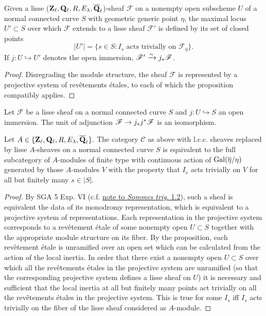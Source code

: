\documentclass[deligne.tex]{subfiles}
\begin{document}
\begin{corollary*}
	Given a lisse ($\mathbf{Z}_\ell,\mathbf{Q}_\ell,R,E_\lambda,\overline{\mathbf{Q}}_{\ell}$)-sheaf
	$\mathscr F$ on a nonempty open subscheme $U$ of a normal connected curve 
	$S$ with geometric generic point $\eta$, the maximal locus $U'\subset S$ 
	over which $\mathscr F$ extends to a lisse sheaf $\mathscr F'$ is defined
	by its set of closed points
	\begin{equation*}
		|U'|=\{s\in S:I_s\text{ acts trivially on }\mathscr F_{\overline\eta}\}.
	\end{equation*}
	If $j:U\hookrightarrow U'$ denotes the open immersion,
	$\mathscr F'\xrightarrow\sim j_*\mathscr F$.
\end{corollary*}
\begin{proof}
	Disregrading the module structure, the sheaf $\mathscr F$ is represented
	by a projective system of revêtements étales, to each of which the
	proposition compatibly applies.
\end{proof}
\begin{corollary*}
	Let $\mathscr F$ be a lisse sheaf on a normal connected curve $S$ and
	$j:U\hookrightarrow S$ an open immersion.
	The unit of adjunction $\mathscr F\rightarrow j_*j^*\mathscr F$ is an 
	isomorphism.
\end{corollary*}
\begin{corollary*}
	Let $A\in\{\mathbf{Z}_\ell,\mathbf{Q}_\ell,R,E_\lambda,\overline{\mathbf{Q}}_{\ell}\}$.
	The category $\mathscr C$ as above with l.c.c. sheaves replaced by lisse
	$A$-sheaves on a normal connected curve $S$ is equivalent to the full 
	subcategory of $A$-modules of finite type with continuous action of
	$\operatorname{Gal}(\overline\eta/\eta)$ generated by those $A$-modules $V$ with
	the property that $I_s$ acts trivially on $V$ for all but finitely many
	$s\in|S|$.
\end{corollary*}
\begin{proof}
	By SGA 5 Exp. VI
	(c.f. \hyperref[sec:st1.2]{note to \emph{Sommes trig.} 1.2}),
	such a sheaf is equivalent the data of its monodromy
	representation, which is equivalent to a projective system of 
	representations. Each representation in the projective system corresponds
	to a revêtement étale of some nonempty open $U\subset S$ together with
	the appropriate module structure on its fiber. By the proposition, each
	revêtement étale is unramified over an open set which can be calculated
	from the action of the local inertia. In order that there exist a
	nonempty open $U\subset S$ over which all the revêtements étales in the
	projective system are unramified (so that the corresponding projective
	system defines a lisse sheaf on $U$) it is necessary and sufficient that
	the local inertia at all but finitely many points act trivially on all
	the revêtements étales in the projective system. This is true for 
	some $I_s$ iff $I_s$ acts trivially on the fiber of the lisse sheaf
	considered as $A$-module.
\end{proof}
\end{document}
